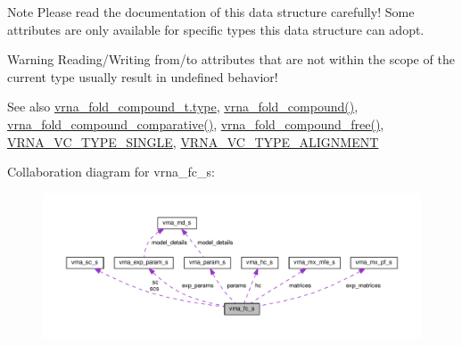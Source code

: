 \begin{DoxyNote}{Note}
Please read the documentation of this data structure carefully! Some attributes are only available for specific types this data structure can adopt.
\end{DoxyNote}
\begin{DoxyWarning}{Warning}
Reading/\+Writing from/to attributes that are not within the scope of the current type usually result in undefined behavior!
\end{DoxyWarning}
\begin{DoxySeeAlso}{See also}
\hyperlink{group__fold__compound_ac5eab693deac9a1a40c2a95ac294707c}{vrna\+\_\+fold\+\_\+compound\+\_\+t.\+type}, \hyperlink{group__fold__compound_ga6601d994ba32b11511b36f68b08403be}{vrna\+\_\+fold\+\_\+compound()}, \hyperlink{group__fold__compound_gad6bacc816af274922b13d947f708aa0c}{vrna\+\_\+fold\+\_\+compound\+\_\+comparative()}, \hyperlink{group__fold__compound_gadded6039d63f5d6509836e20321534ad}{vrna\+\_\+fold\+\_\+compound\+\_\+free()}, \hyperlink{group__fold__compound_gga01a4ff86fa71deaaa5d1abbd95a1447da1608d3aa78905fc39e0d25a624ac9512}{V\+R\+N\+A\+\_\+\+V\+C\+\_\+\+T\+Y\+P\+E\+\_\+\+S\+I\+N\+G\+L\+E}, \hyperlink{group__fold__compound_gga01a4ff86fa71deaaa5d1abbd95a1447da056345f1bcfe7cd595d1fd437c05246d}{V\+R\+N\+A\+\_\+\+V\+C\+\_\+\+T\+Y\+P\+E\+\_\+\+A\+L\+I\+G\+N\+M\+E\+N\+T} 
\end{DoxySeeAlso}


Collaboration diagram for vrna\+\_\+fc\+\_\+s\+:
\nopagebreak
\begin{figure}[H]
\begin{center}
\leavevmode
\includegraphics[width=350pt]{structvrna__fc__s__coll__graph}
\end{center}
\end{figure}

